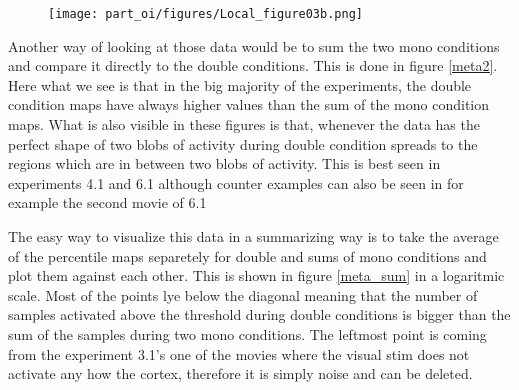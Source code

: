 \begin{figure}[!hp] \centerline{
\label{loc_countmap}\texttt{[image: part\_oi/figures/Local\_figure03b.png]}}
\caption{} \end{figure}

Another way of looking at those data would be to sum the two mono
conditions and compare it directly to the double conditions. This is done
in figure \ref{meta2}. Here what we see is that in the big majority of the
experiments, the double condition maps have always higher values than the
sum of the mono condition maps. What is also visible in these figures is
that, whenever the data has the perfect shape of two blobs of activity
during double condition spreads to the regions which are in between two
blobs of activity. This is best seen in experiments 4.1 and 6.1 although
counter examples can also be seen in for example the second movie of 6.1


The easy way to visualize this data in a summarizing way is to take the
average of the percentile maps separetely for double and sums of mono
conditions and plot them against each other. This is shown in figure
\ref{meta_sum} in a logaritmic scale. Most of the points lye below the
diagonal meaning that the number of samples activated above the threshold
during double conditions is bigger than the sum of the samples during two
mono conditions. The leftmost point is coming from the experiment 3.1's one
of the movies where the visual stim does not activate any how the cortex,
therefore it is simply noise and can be deleted.

